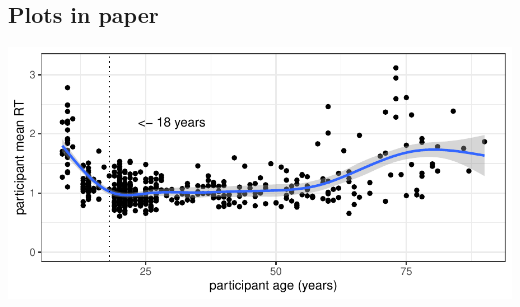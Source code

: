 \documentclass[
]{article}
\begin{document}
\subsection{Plots in paper}\label{plots-in-paper}

\includegraphics{figures/plot1-1.pdf}
\end{document}
